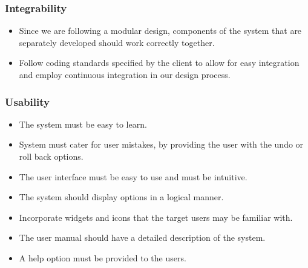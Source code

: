 \documentclass{article}
\begin{document}
		\subsubsection{Integrability}
		
			\begin{itemize}
				\item Since we are following a modular design, components of the system that are separately developed should work correctly together.
				\item Follow coding standards specified by the client to allow for easy integration and employ continuous integration in our design process.
			\end{itemize}
		
		\subsubsection{Usability}
		
			\begin{itemize}
				\item The system must be easy to learn.
				\item System must cater for user mistakes, by providing the user with the undo or roll back options.
				\item The user interface must be easy to use and must be intuitive.
				\item The system should display options in a logical manner.
				\item Incorporate widgets and icons that the target users may be familiar with.
				\item The user manual should have a detailed description of the system.
				\item A help option must be provided to the users.
			\end{itemize}
\end{document}
